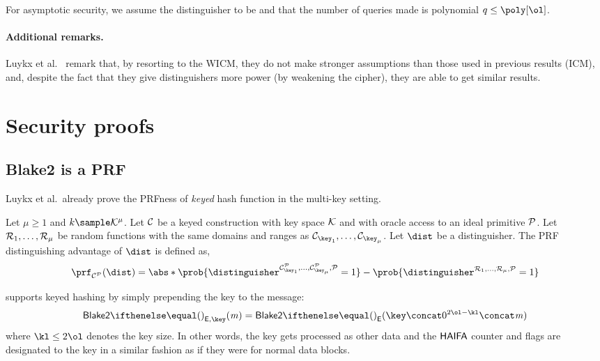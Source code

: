 For asymptotic security, we assume the distinguisher to be \ppt{} and that the number of queries made is polynomial $q\leq \poly[\ol]$.

\paragraph{Additional remarks.}

Luykx et al.~\cite{luykx2016security} remark that, by resorting to the WICM, they do not make stronger assumptions than those used in previous results (ICM), and, despite the fact that they give distinguishers more power (by weakening the cipher), they are able to get similar results.

\section{Security proofs}\label{appendix:blake:proofs}

\subsection{Blake2 is a PRF}\label{appendix:blake:proofs:prf}

Luykx et al.~already prove the PRFness of  \textit{keyed} hash function in the multi-key setting.

\begin{definition}
	Let $\mu \geq 1$ and $k \sample \keyspace^\mu$. Let $\mathcal{C}$ be a keyed construction with key space $\mathcal{K}$ and with oracle access to an ideal primitive $\mathcal{P}$. Let $\mathcal{R}_1, \ldots, \mathcal{R}_\mu$ be random functions with the same domains and ranges as $\primC_{\key_1}, \ldots, \primC_{\key_\mu}$. Let $\dist$ be a distinguisher. The PRF distinguishing advantage of $\dist$ is defined as,
\[
    \prf_{\primC^\primP}(\dist) = \abs*{\prob{\distinguisher^{\primC^\primP_{\key_1}, \ldots, \primC^\primP_{\key_\mu}, \primP} = 1} - \prob{\distinguisher^{\primR_1, \ldots, \primR_\mu, \primP} = 1}}
\]
\end{definition}

 supports keyed hashing by simply prepending the key to the message:
\[
    \blake{2}{}_{\Enc,\key}(\msg) = \blake{2}{}_{\Enc}(\key \concat 0^{2\ol - \kl} \concat \msg)
\]
where $\kl \leq 2\ol$ denotes the key size. In other words, the key gets processed as other data and the $\mathsf{HAIFA}$ counter and flags are designated to the key in a similar fashion as if they were for normal data blocks.

